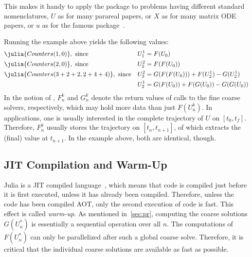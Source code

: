 This makes it handy to apply the package to problems having different standard nomenclatures,
\eg $U$ as for many parareal papers, or
$X$ as for many matrix \ac{ODE} papers, or
$u$ as for the famous  package~\cite{DifferentialEquations}.

Running the example above yields the following values:
\begin{align*}
  &\julia{Counters(1,0)}, \text{ since} &
  U_1^1 &= F(U_0) \\
  &\julia{Counters(2,0)}, \text{ since} &
  U_2^2 &= F(F(U_0)) \\
  &\julia{Counters(3+2+2,2+4+4)}, \text{ since} &
  U_3^2 &= G(F(F(U_0))) + F(U_2^1) - G(U_2^1) \\
  && U_2^1 &= G(F(U_0)) + F(G(U_0)) - G(G(U_0))
\end{align*}
In the notion of ,
$F_n^k$ and $G_n^k$ denote the return values of calls to the fine coarse solvers, respectively,
which may hold more data than just $F(U_n^k)$.
In applications, one is usually interested in the complete trajectory of $U$ on $[t_0,t_f]$.
Therefore, $F_n^k$ usually stores the trajectory on $[t_n,t_{n+1}]$,
of which  extracts the (final) value at $t_{n+1}$.
In the example above, both are identical, though.


\subsection{JIT Compilation and Warm-Up}

Julia is a \ac{JIT} compiled language~\cite{Julia},
which means that code is compiled just before it is first executed,
unless it has already been compiled.
Therefore, unless the code has been compiled \ac{AOT},
only the second execution of code is fast.
This effect is called \emph{warm-up}.
As mentioned in~\autoref{sec:pr}, computing the coarse solutions
$G(U_n^*)$ is essentially a sequential operation over all $n$.
The computations of $F(U^*_n)$ can only be parallelized after such a global coarse solve.
Therefore, it is critical that the individual coarse solutions are available as fast as possible.


